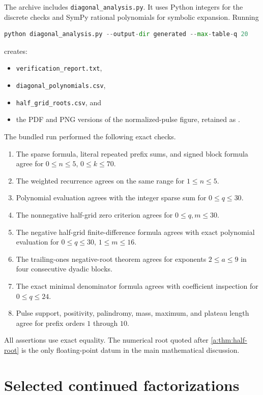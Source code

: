 \documentclass[11pt,a4paper,oneside,openany]{book}
\numberwithin{equation}{chapter}
\theoremstyle{definition}
\theoremstyle{remark}
\begin{document}
The archive includes \texttt{diagonal\_analysis.py}.  It uses Python integers
for the discrete checks and SymPy rational polynomials for symbolic
expansion.  Running
\begin{lstlisting}[language=Python]
python diagonal_analysis.py --output-dir generated --max-table-q 20
\end{lstlisting}
creates:
\begin{itemize}[leftmargin=2em]
\item \texttt{verification\_report.txt},
\item \texttt{diagonal\_polynomials.csv},
\item \texttt{half\_grid\_roots.csv}, and
\item the PDF and PNG versions of the normalized-pulse figure, retained as .
\end{itemize}

The bundled run performed the following exact checks.

\begin{enumerate}[leftmargin=2.2em]
\item The sparse formula, literal repeated prefix sums, and signed block
formula agree for \(0\leq n\leq5\), \(0\leq k\leq70\).
\item The weighted recurrence agrees on the same range for
\(1\leq n\leq5\).
\item Polynomial evaluation agrees with the integer sparse sum for
\(0\leq q\leq30\).
\item The nonnegative half-grid zero criterion agrees for
\(0\leq q,m\leq30\).
\item The negative half-grid finite-difference formula agrees with exact
polynomial evaluation for \(0\leq q\leq30\), \(1\leq m\leq16\).
\item The trailing-ones negative-root theorem agrees for exponents
\(2\leq a\leq9\) in four consecutive dyadic blocks.
\item The exact minimal denominator formula agrees with coefficient
inspection for \(0\leq q\leq24\).
\item Pulse support, positivity, palindromy, mass, maximum, and plateau length
agree for prefix orders \(1\) through \(10\).
\end{enumerate}

All assertions use exact equality.  The numerical root quoted after
\cref{a:thm:half-root} is the only floating-point datum in the main
mathematical discussion.

\section{Selected continued factorizations}
\end{document}
